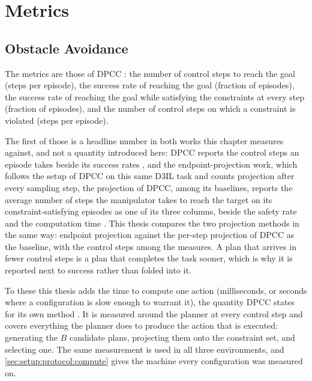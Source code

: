 \section{Metrics}\label{sec:setup:metrics}

\subsection{Obstacle Avoidance}\label{sec:setup:metrics:avoiding}

The metrics are those of \ac{DPCC} \parencite[Sec.~6.1]{romer2025diffusion}: the number of control
steps to reach the goal (steps per episode), the success rate of reaching the goal (fraction of episodes),
the success rate of reaching the goal while satisfying the constraints at every step (fraction of
episodes), and the number of control steps on which a constraint is violated (steps per episode).

The first of those is a headline number in both works this chapter measures against, and not a
quantity introduced here: \ac{DPCC} reports the control steps an episode takes beside its success
rates \parencite[Sec.~6.1]{romer2025diffusion}, and the endpoint-projection work, which follows the setup of
\ac{DPCC} on this same D3IL task and counts projection after every sampling step, the projection of \ac{DPCC},
among its baselines, reports the average number of steps the manipulator takes to reach the target on its
constraint-satisfying episodes as one of its three columns, beside the safety rate and the computation time
\parencite[Sec.~VII-A, Table~II]{li2025hardflow}. This thesis compares the two projection methods in the same
way: endpoint projection against the per-step projection of \ac{DPCC} as the baseline, with the control steps
among the measures. A plan that arrives in
fewer control steps is a plan that completes the task sooner, which is why it is reported next to
success rather than folded into it.

To these this thesis adds the time to compute one action (milliseconds, or seconds where a
configuration is slow enough to warrant it), the quantity \ac{DPCC} states for its own
method \parencite[Sec.~6]{romer2025diffusion}. It is measured around the planner at every control step
and covers everything the planner does to produce the action that is executed: generating the $B$
candidate plans, projecting them onto the constraint set, and selecting one. The same measurement is
used in all three environments, and
\autoref{sec:setup:protocol:compute} gives the machine every configuration was measured on.

